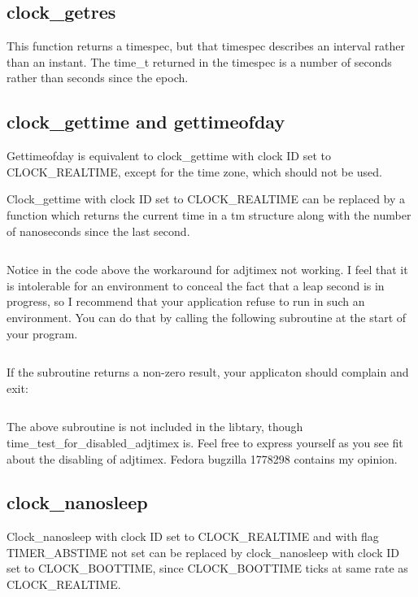 \documentclass[letterpaper,twoside]{article}
\begin{document}
\subsection{clock\_getres}
This function returns a timespec, but that timespec describes an interval
rather than an instant.  The {\ttfamily time\_t} returned in the timespec is a
number of seconds rather than seconds since the epoch.

\subsection{clock\_gettime and gettimeofday}
Gettimeofday is equivalent to clock\_gettime with clock ID set to
CLOCK\_REAL\-TIME, except for the time zone, which should not be used.

Clock\_gettime with clock ID set to CLOCK\_REAL\-TIME can be replaced by
a function which returns the current time in a {\ttfamily tm} structure along
with the number of nanoseconds since the last second.
\inputminted[firstline=34]{c}{src/time_current_tm_nano.c}

Notice in the code above the workaround for {\ttfamily adjtimex}
not working.  I feel that it is intolerable for an environment to
conceal the fact that a leap second is in progress, so I recommend
that your application refuse to run in such an environment.  You
can do that by calling the following subroutine at the start
of your program.
\inputminted[firstline=36]{c}{src/time_test_for_disabled_adjtimex.c}
If the subroutine returns a non-zero result, your applicaton should
complain and exit:
\inputminted[firstline=47,lastline=67]{c}{tests/test_for_disabled_adjtimex.c}
The above subroutine is not included in the libtary, though
{\ttfamily time\_test\_for\_disabled\_adjtimex} is.
Feel free to express yourself as you see fit about the disabling
of {\ttfamily adjtimex}.  Fedora bugzilla 1778298 contains my
opinion.

\subsection{clock\_nanosleep}
Clock\_nanosleep with clock ID set to CLOCK\_REAL\-TIME and with flag
TIMER\_ABS\-TIME not set can be replaced by clock\_nanosleep with
clock ID set to CLOCK\_BOOTTIME, since CLOCK\_BOOTTIME ticks at
same rate as CLOCK\_REAL\-TIME.
\end{document}
